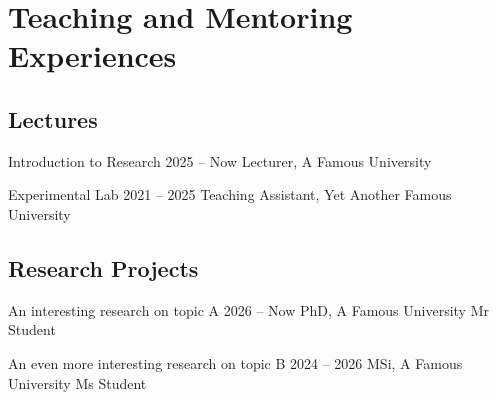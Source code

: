 \documentclass[a4paper,11pt]{article}
\begin{document}
\section{Teaching and Mentoring Experiences}

\subsection{Lectures}

\experience
	{Introduction to Research}
	{2025 -- Now}
	{Lecturer, A Famous University}
	{}{}

\experience
	{Experimental Lab}
	{2021 -- 2025}
	{Teaching Assistant, Yet Another Famous University}
	{}{}

\subsection{Research Projects}

\experience
	{An interesting research on topic A}
	{2026 -- Now}
	{PhD, A Famous University}
	{Mr Student}
	{}

\experience
	{An even more interesting research on topic B}
	{2024 -- 2026}
	{MSi, A Famous University}
	{Ms Student}
	{}
\end{document}
